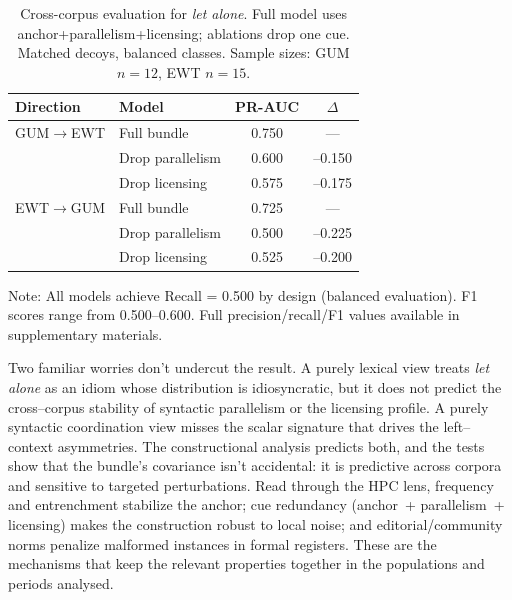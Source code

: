 \documentclass[12pt]{article}
\begin{document}
\begin{table}[t]
  \centering
  \caption{Cross-corpus evaluation for \textit{let alone}. Full model uses anchor+parallelism+licensing; ablations drop one cue. Matched decoys, balanced classes. Sample sizes: GUM $n{=}12$, EWT $n{=}15$.}
  \label{tab:letalone-eval}
  \begin{tabular}{llcc}
    \toprule
    Direction & Model & PR-AUC & $\Delta$ \\
    \midrule
    GUM$\to$EWT & Full bundle & 0.750 & --- \\
                & Drop parallelism & 0.600 & --0.150 \\
                & Drop licensing & 0.575 & --0.175 \\
    \addlinespace
    EWT$\to$GUM & Full bundle & 0.725 & --- \\
                & Drop parallelism & 0.500 & --0.225 \\
                & Drop licensing & 0.525 & --0.200 \\
    \bottomrule
  \end{tabular}
  
  \smallskip
  \footnotesize
  Note: All models achieve Recall = 0.500 by design (balanced evaluation). F1 scores range from 0.500--0.600. Full precision/recall/F1 values available in supplementary materials.
\end{table}


Two familiar worries don't undercut the result. A purely lexical view treats \emph{let alone} as an idiom whose distribution is idiosyncratic, but it does not predict the cross–corpus stability of syntactic parallelism or the licensing profile. A purely syntactic coordination view misses the scalar signature that drives the left–context asymmetries. The constructional analysis predicts both, and the tests show that the bundle’s covariance isn't accidental: it is predictive across corpora and sensitive to targeted perturbations. Read through the \textsc{HPC} lens, frequency and entrenchment stabilize the anchor; cue redundancy (anchor~+ parallelism~+ licensing) makes the construction robust to local noise; and editorial/community norms penalize malformed instances in formal registers. These are the mechanisms that keep the relevant properties together in the populations and periods analysed.
\end{document}
